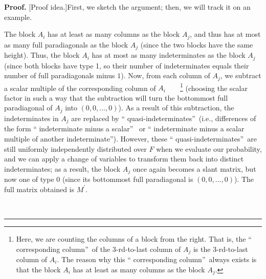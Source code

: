 \documentclass[numbers=enddot,12pt,final,onecolumn,notitlepage]{scrartcl}%
\theoremstyle{definition}
\newenvironment{proof}[1][Proof]{\noindent\textbf{#1.} }{\ \rule{0.5em}{0.5em}}
\theoremstyle{plainsl}
\begin{document}
\begin{proof}
[Proof idea.]First, we sketch the argument; then, we will track it on an example.

The block $A_{i}$ has at least as many columns as the block $A_{j}$, and thus
has at most as many full paradiagonals as the block $A_{j}$ (since the two
blocks have the same height). Thus, the block $A_{i}$ has at most as many
indeterminates as the block $A_{j}$ (since both blocks have type 1, so their
number of indeterminates equals their number of full paradiagonals minus $1$).
Now, from each column of $A_{j}$, we subtract a scalar multiple of the
corresponding column of $A_{i}$\ \ \ \ \footnote{Here, we are counting the
columns of a block from the right. That is, the ``
corresponding column''\ of the $3$-rd-to-last column of
$A_{j}$ is the $3$-rd-to-last column of $A_{i}$. The reason why this
`` corresponding column''\ always exists is
that the block $A_{i}$ has at least as many columns as the block $A_{j}$.}
(choosing the scalar factor in such a way that the subtraction will turn the
bottommost full paradiagonal of $A_{j}$ into $\left(  0,0,\ldots,0\right)  $).
As a result of this subtraction, the indeterminates in $A_{j}$ are replaced by
`` quasi-indeterminates''\ (i.e., differences
of the form `` indeterminate minus a scalar''%
\ or `` indeterminate minus a scalar multiple of another
indeterminate''). However, these ``
quasi-indeterminates''\ are still uniformly independently
distributed over $F$ when we evaluate our probability, and we can apply a
change of variables to transform them back into distinct indeterminates; as a
result, the block $A_{j}$ once again becomes a slant matrix, but now one of
type 0 (since its bottommost full paradiagonal is $\left(  0,0,\ldots
,0\right)  $). The full matrix obtained is $M^{\prime}$.


\end{proof}
\end{document}
